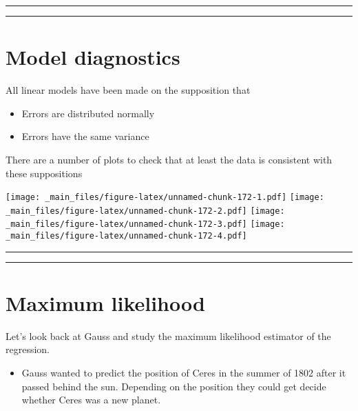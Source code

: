 \documentclass[
]{book}
\providecommand{\tightlist}{%
  \setlength{\itemsep}{0pt}\setlength{\parskip}{0pt}}
\begin{document}
\begin{center}\rule{0.5\linewidth}{0.5pt}\end{center}

\begin{center}\rule{0.5\linewidth}{0.5pt}\end{center}

\hypertarget{model-diagnostics}{%
\section{Model diagnostics}\label{model-diagnostics}}

All linear models have been made on the supposition that

\begin{itemize}
\item
  Errors are distributed normally
\item
  Errors have the same variance
\end{itemize}

There are a number of plots to check that at least the data is consistent with these suppositions

\texttt{[image: \_main\_files/figure-latex/unnamed-chunk-172-1.pdf]} \texttt{[image: \_main\_files/figure-latex/unnamed-chunk-172-2.pdf]} \texttt{[image: \_main\_files/figure-latex/unnamed-chunk-172-3.pdf]} \texttt{[image: \_main\_files/figure-latex/unnamed-chunk-172-4.pdf]}

\begin{center}\rule{0.5\linewidth}{0.5pt}\end{center}

\begin{center}\rule{0.5\linewidth}{0.5pt}\end{center}

\hypertarget{maximum-likelihood-3}{%
\section{Maximum likelihood}\label{maximum-likelihood-3}}

Let's look back at Gauss and study the maximum likelihood estimator of the regression.

\begin{itemize}
\tightlist
\item
  Gauss wanted to predict the position of Ceres in the summer of 1802 after it passed behind the sun. Depending on the position they could get decide whether Ceres was a new planet.
\end{itemize}
\end{document}
